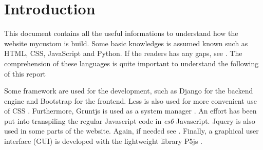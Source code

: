 \section{Introduction}

This document contains all the useful informations to understand how the website mycustom is build. Some basic knowledges is assumed known such as HTML, CSS, JavaScript and Python. If the readers has any gaps, see \cite{Javascript, Python, HTML_CSS, CSS_Advanced}. The comprehension of these languages is quite important to understand the following of this report 

Some framework are used for the development, such as Django \cite{Django, Django_doc} for the backend engine and Bootstrap \cite{Bootstrap, Bootstrap_doc} for the frontend. Less is also used for more convenient use of CSS \cite{less_doc} . Furthermore, Gruntjs is used as a system manager \cite{Grunt_doc}. An effort has been put into transpiling the regular Javascript code in \textit{es6} Javascript. Jquery is also used in some parts of the website. Again, if needed see \cite{Jquery, Jquery_doc}. Finally, a graphical user interface (GUI) is developed with the lightweight library P5js \cite{P5_doc}.  
 